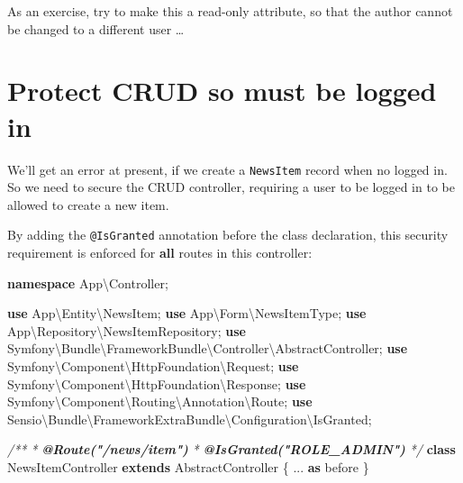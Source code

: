 \documentclass[a4paperpaper,openright]{book}
\newenvironment{Shaded}{}{}
\newcommand{\AnnotationTok}[1]{\textcolor[rgb]{0.38,0.63,0.69}{\textbf{\textit{#1}}}}
\newcommand{\CommentTok}[1]{\textcolor[rgb]{0.38,0.63,0.69}{\textit{#1}}}
\newcommand{\KeywordTok}[1]{\textcolor[rgb]{0.00,0.44,0.13}{\textbf{#1}}}
\newcommand{\NormalTok}[1]{#1}
\newcommand{\OtherTok}[1]{\textcolor[rgb]{0.00,0.44,0.13}{#1}}
\newcommand{\StringTok}[1]{\textcolor[rgb]{0.25,0.44,0.63}{#1}}
\begin{document}
As an exercise, try to make this a read-only attribute, so that the
author cannot be changed to a different user \ldots{}

\hypertarget{protect-crud-so-must-be-logged-in}{%
\section{Protect CRUD so must be logged
in}\label{protect-crud-so-must-be-logged-in}}

We'll get an error at present, if we create a \texttt{NewsItem} record
when no logged in. So we need to secure the CRUD controller, requiring a
user to be logged in to be allowed to create a new item.

By adding the \texttt{@IsGranted} annotation before the class
declaration, this security requirement is enforced for \textbf{all}
routes in this controller:

\begin{Shaded}
\begin{Highlighting}[]
    \KeywordTok{namespace}\NormalTok{ App\textbackslash{}Controller}\OtherTok{;}
    
    \KeywordTok{use}\NormalTok{ App\textbackslash{}Entity\textbackslash{}NewsItem}\OtherTok{;}
    \KeywordTok{use}\NormalTok{ App\textbackslash{}Form\textbackslash{}NewsItemType}\OtherTok{;}
    \KeywordTok{use}\NormalTok{ App\textbackslash{}Repository\textbackslash{}NewsItemRepository}\OtherTok{;}
    \KeywordTok{use}\NormalTok{ Symfony\textbackslash{}Bundle\textbackslash{}FrameworkBundle\textbackslash{}Controller\textbackslash{}AbstractController}\OtherTok{;}
    \KeywordTok{use}\NormalTok{ Symfony\textbackslash{}Component\textbackslash{}HttpFoundation\textbackslash{}Request}\OtherTok{;}
    \KeywordTok{use}\NormalTok{ Symfony\textbackslash{}Component\textbackslash{}HttpFoundation\textbackslash{}Response}\OtherTok{;}
    \KeywordTok{use}\NormalTok{ Symfony\textbackslash{}Component\textbackslash{}Routing\textbackslash{}Annotation\textbackslash{}Route}\OtherTok{;}
    \KeywordTok{use}\NormalTok{ Sensio\textbackslash{}Bundle\textbackslash{}FrameworkExtraBundle\textbackslash{}Configuration\textbackslash{}IsGranted}\OtherTok{;}
    
    
    \CommentTok{/**}
\CommentTok{     * }\AnnotationTok{@Route("/news/item")}
\CommentTok{     * }\AnnotationTok{@IsGranted("ROLE_ADMIN")}
\CommentTok{     */}
    \KeywordTok{class}\NormalTok{ NewsItemController }\KeywordTok{extends}\NormalTok{ AbstractController}
\NormalTok{    \{}
            \StringTok{...} \KeywordTok{as}\NormalTok{ before}
\NormalTok{    \}}
\end{Highlighting}
\end{Shaded}
\end{document}
